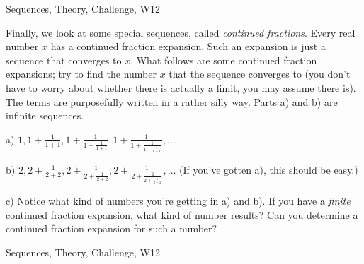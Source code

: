 


\begin{tagblock}{Sequences, Theory, Challenge, W12}
\begin{question}

Finally, we look at some special sequences, called \textit{continued fractions}. Every real number $x$ has a continued fraction expansion. Such an expansion is just a sequence that converges to $x$. What follows are some continued fraction expansions; try to find the number $x$ that the sequence converges to (you don't have to worry about whether there is actually a limit, you may assume there is). The terms are purposefully written in a rather silly way. Parts a) and b) are infinite sequences. 

\bigskip 

a) $1, 1+\frac 1{1+1},1+\frac 1 {1+\frac 1 {1+1}},1+\frac 1 {1+\frac 1 {1+\frac 1 {1+1}}},\dots$ 

\bigskip

b) $2, 2+\frac 1 {2+2},2+\frac 1 {2+\frac 1 {2+2}},2+\frac 1 {2+\frac 1 {2+\frac 1 {2+2}}},\dots$ (If you've gotten a), this should be easy.)

\bigskip

c) Notice what kind of numbers you're getting in a) and b). If you have a \textit{finite} continued fraction expansion, what kind of number results? Can you determine a continued fraction expansion for such a number?

	
	
\begin{tags}
	    Sequences, Theory, Challenge, W12
\end{tags}
	
\begin{diary}
	   
\end{diary}
	
\begin{solution}	

\end{solution}
	
\end{question}

\end{tagblock}


